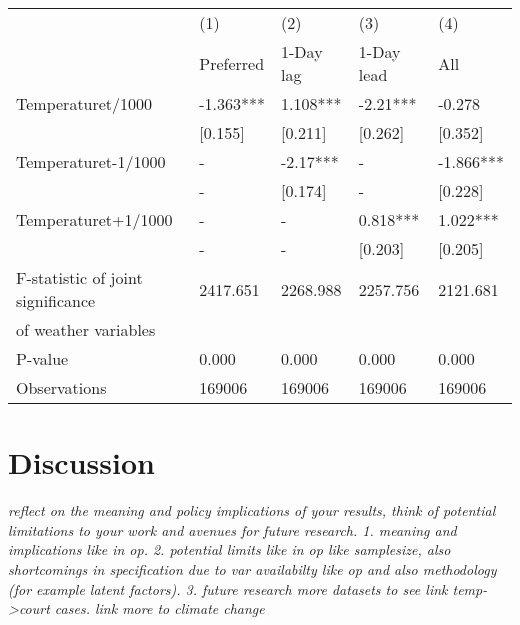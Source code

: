 \documentclass[11pt]{article}
\begin{document}
	
	\begin{center}
	 \label{tab:title} 
	\begin{tabular}{lllll}
		\toprule
		{} &        (1) &       (2) &       (3) &        (4) \\
		&  Preferred &    1-Day lag &   1-Day lead &          All \\
		\midrule
		Temperaturet/1000                 &  -1.363*** &  1.108*** &  -2.21*** &     -0.278 \\
		&    [0.155] &   [0.211] &   [0.262] &    [0.352] \\
		Temperaturet-1/1000               &          - &  -2.17*** &         - &  -1.866*** \\
		&          - &   [0.174] &         - &    [0.228] \\
		Temperaturet+1/1000               &          - &         - &  0.818*** &   1.022*** \\
		&            - &            - &      [0.203] &      [0.205] \\
		F-statistic of joint significance &   2417.651 &  2268.988 &  2257.756 &   2121.681 \\
		of weather variables              &            &           &           &            \\
		P-value                           &      0.000 &     0.000 &     0.000 &      0.000 \\
		\midrule
		Observations                      &     169006 &    169006 &    169006 &     169006 \\
		\bottomrule
	\end{tabular}
	\end{center}
	
	\section{Discussion}
	\textit{reflect on the meaning and policy implications of your results, think of potential limitations to your work and avenues for future research.
		1. meaning and implications like in op. 
		2. potential limits like in op like samplesize, also shortcomings in specification due to var availabilty like op and also methodology (for example latent factors).
		3. future research more datasets to see link temp->court cases. link more to climate change
	}
\end{document}
